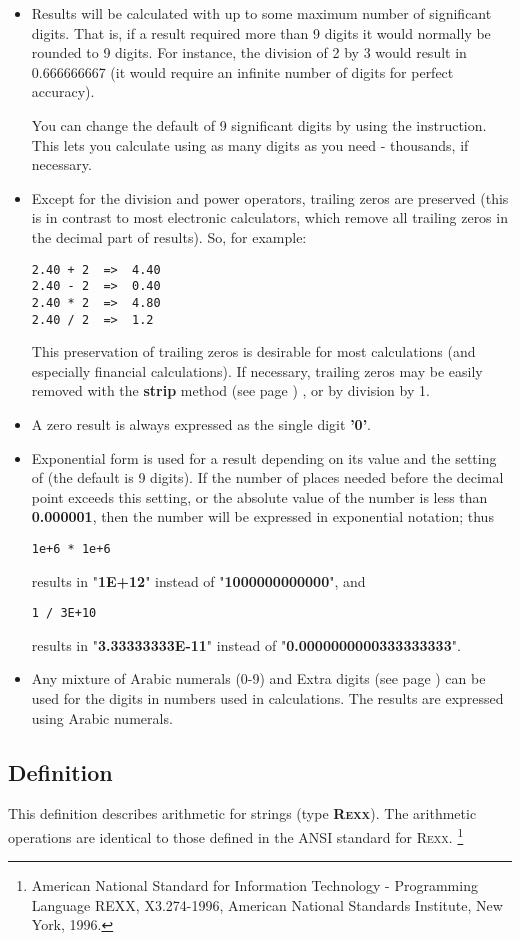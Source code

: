 \begin{itemize}
\item Results will be calculated with up to some maximum number of
significant digits.
That is, if a result required more than 9 digits it would normally be
rounded to 9 digits.
For instance, the division of 2 by 3 would result in 0.666666667 (it
would require an infinite number of digits for perfect accuracy).
 
You can change the default of 9 significant digits by using the
 instruction.  This lets you calculate using
as many digits as you need - thousands, if necessary.
\item Except for the division and power operators, trailing zeros are
preserved (this is in contrast to most electronic calculators, which
remove all trailing zeros in the decimal part of results).
So, for example:
\begin{lstlisting}
2.40 + 2  =>  4.40
2.40 - 2  =>  0.40
2.40 * 2  =>  4.80
2.40 / 2  =>  1.2
\end{lstlisting}
This preservation of trailing zeros is desirable for most
calculations (and especially financial calculations).
 If necessary, trailing zeros may be easily removed with the
 \textbf{strip} method (see page \pageref{refstrip}) , or by division by 1.
\item A zero result is always expressed as the single
digit \textbf{'0'}.
\item 
Exponential form is used for a result depending on its value and
the setting of  (the default is 9 digits).
If the number of places needed before the decimal point exceeds this
setting, or the absolute value of the number is less
than \textbf{0.000001}, then the number will be expressed in
exponential notation; thus
\begin{lstlisting}
1e+6 * 1e+6
\end{lstlisting}
results in "\textbf{1E+12}" instead of
"\textbf{1000000000000}", and
\begin{lstlisting}
1 / 3E+10
\end{lstlisting}
results in "\textbf{3.33333333E-11}" instead of
"\textbf{0.0000000000333333333}".
\item 
Any mixture of Arabic numerals (0-9) and  Extra digits (see page \pageref{refsyms}) 
can be used for the digits in numbers used in calculations.  The results
are expressed using Arabic numerals.
\end{itemize}
\subsection{Definition}\label{arithdefinition}
 This definition describes arithmetic for \nr{} strings
(type \textbf{R\textsc{exx}}).
The arithmetic operations are identical to those defined in the ANSI
standard for R\textsc{exx}.
\footnote{
American National Standard for Information Technology -
Programming Language REXX, X3.274-1996, American National
Standards Institute, New York, 1996.
}
